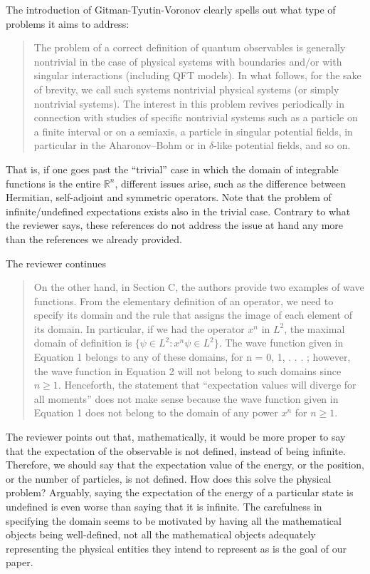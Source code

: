 \documentclass[11pt, executivepaper]{article}
\begin{document}
The introduction of Gitman-Tyutin-Voronov clearly spells out what type of problems it aims to address:
\begin{quote}
The problem of a correct definition of quantum observables is generally nontrivial in the case of physical systems with boundaries and/or with singular interactions (including QFT models). In what
follows, for the sake of brevity, we call such systems nontrivial physical systems (or simply nontrivial systems). The interest in this problem revives periodically in connection with studies of specific nontrivial systems such as a particle on a
finite interval or on a semiaxis, a particle in singular potential fields, in particular in the Aharonov–Bohm or in $\delta$-like potential fields, and so on.
\end{quote}
That is, if one goes past the ``trivial'' case in which the domain of integrable functions is the entire $\mathbb{R}^n$, different issues arise, such as the difference between Hermitian, self-adjoint and symmetric operators. Note that the problem of infinite/undefined expectations exists also in the trivial case. Contrary to what the reviewer says, these references do not address the issue at hand any more than the references we already provided.

The reviewer continues
\begin{quote}
	On the other hand, in Section C, the authors provide two examples of wave
	functions. From the elementary definition of an operator, we need to specify its
	domain and the rule that assigns the image of each element of its domain. In
	particular, if we had the operator $x^n$ in $L^2$, the maximal domain of definition
	is $\{\psi \in L^2 : x^n \psi \in L^2\}$. The wave function given in Equation 1 belongs to any
	of these domains, for n = 0, 1, . . . ; however, the wave function in Equation 2
	will not belong to such domains since $n \geq 1$. Henceforth, the statement that
	``expectation values will diverge for all moments'' does not make sense because
	the wave function given in Equation 1 does not belong to the domain of any
	power $x^n$ for $n \geq 1$.
\end{quote}
The reviewer points out that, mathematically, it would be more proper to say that the expectation of the observable is not defined, instead of being infinite. Therefore, we should say that the expectation value of the energy, or the position, or the number of particles, is not defined. How does this solve the physical problem? Arguably, saying the expectation of the energy of a particular state is undefined is even worse than saying that it is infinite. The carefulness in specifying the domain seems to be motivated by having all the mathematical objects being well-defined, not all the mathematical objects adequately representing the physical entities they intend to represent as is the goal of our paper.
\end{document}
